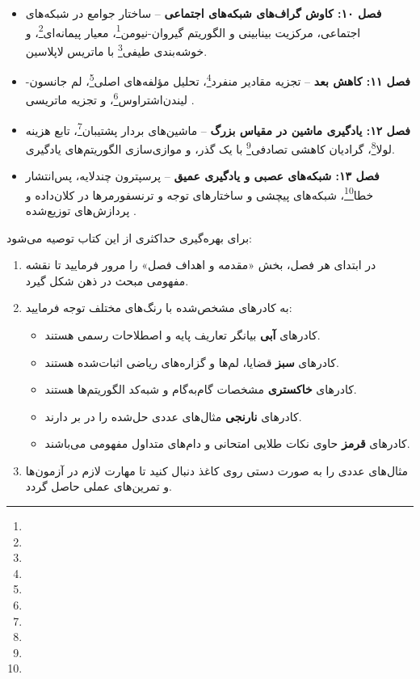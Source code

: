\begin{itemize}
    \item \textbf{فصل ۱۰: کاوش گراف‌های شبکه‌های اجتماعی} -- ساختار جوامع در شبکه‌های اجتماعی، مرکزیت بینابینی و الگوریتم گیروان-نیومن\footnote{}، معیار پیمانه‌ای\footnote{}، و خوشه‌بندی طیفی\footnote{} با ماتریس لاپلاسین.
    \item \textbf{فصل ۱۱: کاهش بعد} -- تجزیه مقادیر منفرد\footnote{}، تحلیل مؤلفه‌های اصلی\footnote{}، لم جانسون-لیندن‌اشتراوس\footnote{}، و تجزیه ماتریسی .
    \item \textbf{فصل ۱۲: یادگیری ماشین در مقیاس بزرگ} -- ماشین‌های بردار پشتیبان\footnote{}، تابع هزینه لولا\footnote{}، گرادیان کاهشی تصادفی\footnote{} با یک گذر، و موازی‌سازی الگوریتم‌های یادگیری.
    \item \textbf{فصل ۱۳: شبکه‌های عصبی و یادگیری عمیق} -- پرسپترون چندلایه، پس‌انتشار خطا\footnote{}، شبکه‌های پیچشی  و ساختارهای توجه و ترنسفورمرها در کلان‌داده و پردازش‌های توزیع‌شده .
\end{itemize}

\begin{summarybox}
برای بهره‌گیری حداکثری از این کتاب توصیه می‌شود:
\begin{enumerate}
    \item در ابتدای هر فصل، بخش «مقدمه و اهداف فصل» را مرور فرمایید تا نقشه مفهومی مبحث در ذهن شکل گیرد.
    \item به کادرهای مشخص‌شده با رنگ‌های مختلف توجه فرمایید:
    \begin{itemize}
        \item کادرهای \textbf{آبی} بیانگر تعاریف پایه و اصطلاحات رسمی هستند.
        \item کادرهای \textbf{سبز} قضایا، لم‌ها و گزاره‌های ریاضی اثبات‌شده هستند.
        \item کادرهای \textbf{خاکستری} مشخصات گام‌به‌گام و شبه‌کد الگوریتم‌ها هستند.
        \item کادرهای \textbf{نارنجی} مثال‌های عددی حل‌شده را در بر دارند.
        \item کادرهای \textbf{قرمز} حاوی نکات طلایی امتحانی و دام‌های متداول مفهومی می‌باشند.
    \end{itemize}
    \item مثال‌های عددی را به صورت دستی روی کاغذ دنبال کنید تا مهارت لازم در آزمون‌ها و تمرین‌های عملی حاصل گردد.
\end{enumerate}
\end{summarybox}

